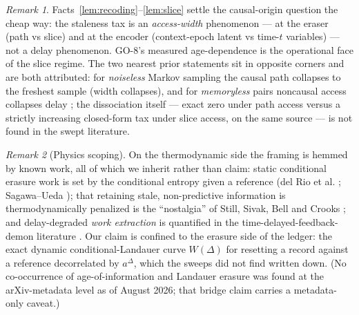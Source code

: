 ﻿\documentclass[11pt]{article}
\theoremstyle{remark}
\newtheorem{remark}{Remark}
\begin{document}
\begin{remark}
Facts~\ref{lem:recoding}--\ref{lem:slice} settle the causal-origin
question the cheap way: the staleness tax is an \emph{access-width}
phenomenon --- at the eraser (path vs slice) and at the encoder
(context-epoch latent vs time-$t$ variables) --- not a delay
phenomenon. GO-8's measured age-dependence is the operational face of
the slice regime. The two nearest prior statements sit in opposite
corners and are both attributed: for \emph{noiseless} Markov sampling
the causal path collapses to the freshest sample
\cite[Lemma~1]{suncyr} (width collapses), and for \emph{memoryless}
pairs noncausal access collapses delay
\cite[Lemma~1]{simeonepermuter}; the dissociation itself --- exact zero
under path access versus a strictly increasing closed-form tax under
slice access, on the same source --- is not found in the swept
literature.
\end{remark}

\begin{remark}[Physics scoping]
On the thermodynamic side the framing is hemmed by known work, all of
which we inherit rather than claim: static conditional erasure work is
set by the conditional entropy given a reference (del Rio et al.
\cite{delrio}; Sagawa--Ueda \cite{sagawaueda}); that retaining stale,
non-predictive information is thermodynamically penalized is the
``nostalgia'' of Still, Sivak, Bell and Crooks \cite{still}; and
delay-degraded \emph{work extraction} is quantified in the
time-delayed-feedback-demon literature \cite{rosinberg}. Our claim is
confined to the erasure side of the ledger: the exact dynamic
conditional-Landauer curve $W(\Delta)$ for resetting a record against a
reference decorrelated by $a^\Delta$, which the sweeps did not find
written down. (No co-occurrence of age-of-information and Landauer
erasure was found at the arXiv-metadata level as of August 2026; that
bridge claim carries a metadata-only caveat.)
\end{remark}
\end{document}
